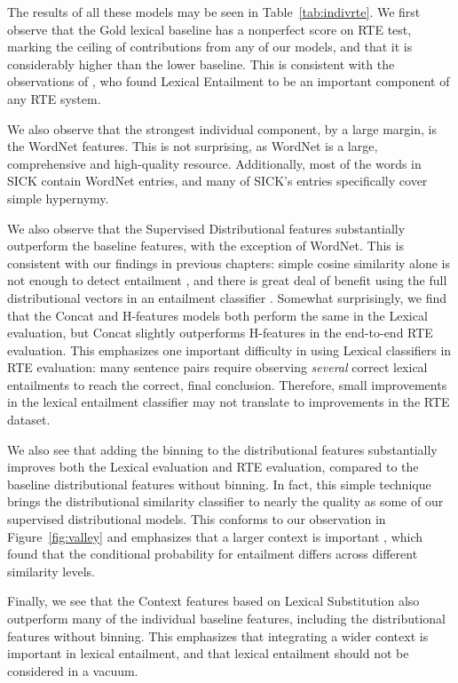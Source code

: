 The results of all these models may be seen in Table~\ref{tab:indivrte}.
We first observe that the Gold lexical baseline has a nonperfect score
on RTE test, marking the ceiling of contributions from any of our models, and
that it is considerably higher than the lower baseline. This is consistent
with the observations of \cite{dagan:2006:mlc}, who found Lexical Entailment
to be an important component of any RTE system.

We also observe that the strongest individual component, by a large margin, is
the WordNet features. This is not surprising, as WordNet is a large,
comprehensive and high-quality resource. Additionally, most of the words in SICK
contain WordNet entries, and many of SICK's entries specifically cover
simple hypernymy.

We also observe that the Supervised Distributional features substantially
outperform the baseline features, with the exception of WordNet. This is
consistent with our findings in previous chapters: simple cosine similarity
alone is not enough to detect entailment
\cite{weeds:2004:coling,baroni:2012:eacl,lenci:2012:starsem}, and there is
great deal of benefit using the full distributional vectors in an entailment
classifier
\cite{roller:2014:coling,kruszewski:2015:tacl,roller:2016:emnlp,shwartz:2016:acl}.
Somewhat surprisingly, we find that the Concat and H-features models both
perform the same in the Lexical evaluation, but Concat slightly outperforms
H-features in the end-to-end RTE evaluation. This emphasizes one important
difficulty in using Lexical classifiers in RTE evaluation: many sentence pairs
require observing {\em several} correct lexical entailments to reach the
correct, final conclusion. Therefore, small improvements in the lexical
entailment classifier may not translate to improvements in the RTE dataset.

We also see that adding the binning to the distributional features
substantially improves both the Lexical evaluation and RTE evaluation, compared
to the baseline distributional features without binning. In fact, this simple
technique brings the distributional similarity classifier to nearly the quality
as some of our supervised distributional models. This conforms to our
observation in Figure~\ref{fig:valley} and emphasizes that a larger context
is important , which found that the conditional
probability for entailment differs across different similarity levels.

Finally, we see that the Context features based on Lexical Substitution
also outperform many of the individual baseline features, including
the distributional features without binning. This emphasizes that integrating
a wider context is important in lexical entailment, and that lexical
entailment should not be considered in a vacuum.

